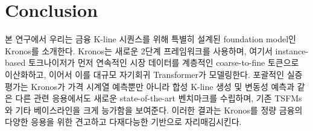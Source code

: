 \section{Conclusion}

본 연구에서 우리는 금융 K-line 시퀀스를 위해 특별히 설계된 foundation model인 Kronos를 소개한다. Kronos는 새로운 2단계 프레임워크를 사용하며, 여기서 instance-based 토크나이저가 먼저 연속적인 시장 데이터를 계층적인 coarse-to-fine 토큰으로 이산화하고, 이어서 이를 대규모 자기회귀 Transformer가 모델링한다. 포괄적인 실증 평가는 Kronos가
가격 시계열 예측뿐만 아니라 합성 K-line 생성 및 변동성 예측과 같은 다른 관련 응용에서도 새로운 state-of-the-art 벤치마크를 수립하며, 기존 TSFMs와 기타 베이스라인을 크게 능가함을 보여준다. 이러한 결과는 Kronos를 정량 금융의 다양한 응용을 위한 견고하고 다재다능한 기반으로 자리매김시킨다.
